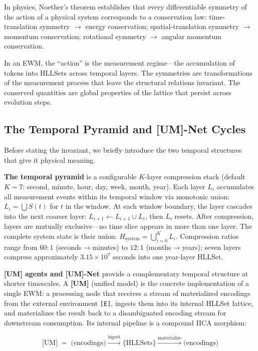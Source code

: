 \documentclass[11pt,a4paper]{article}
\theoremstyle{remark}
\begin{document}
In physics, Noether's theorem \cite{noether1918} establishes that every differentiable
symmetry of the action of a physical system corresponds to a conservation law:
time-translation symmetry $\rightarrow$ energy conservation; spatial-translation
symmetry $\rightarrow$ momentum conservation; rotational symmetry $\rightarrow$ angular
momentum conservation.

In an EWM, the ``action'' is the measurement regime---the accumulation of tokens into
HLLSets across temporal layers. The symmetries are transformations of the measurement
process that leave the structural relations invariant. The conserved quantities are
global properties of the lattice that persist across evolution steps.

\subsection{The Temporal Pyramid and [UM]-Net Cycles}

Before stating the invariant, we briefly introduce the two temporal structures that give
it physical meaning.

\textbf{The temporal pyramid} is a configurable $K$-layer compression stack (default
$K = 7$: second, minute, hour, day, week, month, year). Each layer $L_i$ accumulates
all measurement events within its temporal window via monotonic union:
$L_i = \bigcup S(t)$ for $t$ in the window. At each window boundary, the layer cascades
into the next coarser layer: $L_{i+1} \leftarrow L_{i+1} \cup L_i$, then $L_i$ resets.
After compression, layers are mutually exclusive---no time slice appears in more than one
layer. The complete system state is their union:
$H_{\text{system}} = \bigcup_{i=0}^{K} L_i$. Compression ratios range from $60\!:\!1$
(seconds$\to$minutes) to $12\!:\!1$ (months$\to$years); seven layers compress
approximately $3.15 \times 10^7$ seconds into one year-layer HLLSet.

\textbf{[UM] agents and [UM]-Net} provide a complementary temporal structure at shorter
timescales.  A \textbf{[UM]} (unified model) is the concrete implementation of a single
EWM: a processing node that receives a stream of materialized encodings from the external
environment \texttt{[E]}, ingests them into its internal HLLSet lattice, and materializes
the result back to a disambiguated encoding stream for downstream consumption.  Its
internal pipeline is a compound IICA morphism:

\begin{equation}
  \text{[UM]} \;=\;
  \text{(encodings)} \xrightarrow{\text{ingest}} \{\text{HLLSets}\}
  \xrightarrow{\text{materialize}} \text{(encodings)}
\end{equation}
\end{document}
